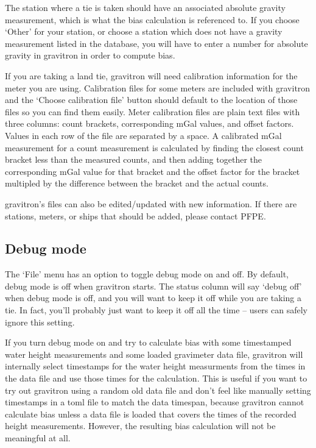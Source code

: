 \documentclass{pfpe-manual}
\begin{document}
The station where a tie is taken should have an associated absolute gravity measurement, which is what the bias calculation is referenced to. If you choose `Other' for your station, or choose a station which does not have a gravity measurement listed in the database, you will have to enter a number for absolute gravity in gravitron in order to compute bias.

If you are taking a land tie, gravitron will need calibration information for the meter you are using. Calibration files for some meters are included with gravitron and the `Choose calibration file' button should default to the location of those files so you can find them easily. Meter calibration files are plain text files with three columns: count brackets, corresponding mGal values, and offset factors. Values in each row of the file are separated by a space. A calibrated mGal measurement for a count measurement is calculated by finding the closest count bracket less than the measured counts, and then adding together the corresponding mGal value for that bracket and the offset factor for the bracket multipled by the difference between the bracket and the actual counts.

gravitron's files can also be edited/updated with new information. If there are stations, meters, or ships that should be added, please contact PFPE.

\subsection{Debug mode}
\label{nobugs}
The `File' menu has an option to toggle debug mode on and off. By default, debug mode is off when gravitron starts. The status column will say `debug off' when debug mode is off, and you will want to keep it off while you are taking a tie. In fact, you'll probably just want to keep it off all the time -- users can safely ignore this setting.

If you turn debug mode on and try to calculate bias with some timestamped water height measurements and some loaded gravimeter data file, gravitron will internally select timestamps for the water height measurments from the times in the data file and use those times for the calculation. This is useful if you want to try out gravitron using a random old data file and don't feel like manually setting timestamps in a toml file to match the data timespan, because gravitron cannot calculate bias unless a data file is loaded that covers the times of the recorded height measurements. However, the resulting bias calculation will not be meaningful at all. 
\end{document}
